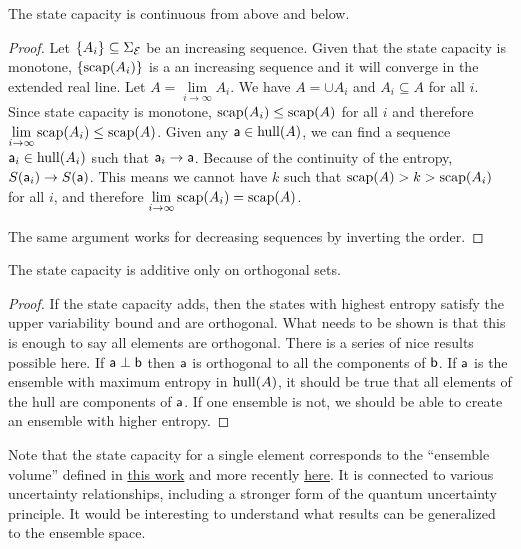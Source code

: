 \begin{mathSection}
\begin{prop}
	The state capacity is continuous from above and below.
\end{prop}

\begin{proof}
	Let $\{A_i\} \subseteq \Sigma_{\Ens}$ be an increasing sequence. Given that the state capacity is monotone, $\{\capacity(A_i)\}$ is a an increasing sequence and it will converge in the extended real line. Let $A = \lim\limits_{i \to \infty} A_i$. We have $A = \cup A_i$ and $A_i \subseteq A$ for all $i$. Since state capacity is monotone, $\capacity(A_i) \leq \capacity(A)$ for all $i$ and therefore $\lim\limits_{i \to \infty} \capacity(A_i) \leq \capacity(A)$. Given any $\ens[a] \in \hull(A)$, we can find a sequence $\ens[a]_i \in \hull(A_i)$ such that $\ens[a]_i \to \ens[a]$. Because of the continuity of the entropy, $S(\ens[a]_i) \to S(\ens[a])$. This means we cannot have $k$ such that $\capacity(A) > k > \capacity(A_i)$ for all $i$, and therefore $\lim\limits_{i \to \infty} \capacity(A_i) = \capacity(A)$.
	
	The same argument works for decreasing sequences by inverting the order.
\end{proof}

\begin{conj}
	The state capacity is additive only on orthogonal sets.
\end{conj}

\begin{proof}
	If the state capacity adds, then the states with highest entropy satisfy the upper variability bound and are orthogonal. What needs to be shown is that this is enough to say all elements are orthogonal. There is a series of nice results possible here. If $\ens[a] \ortho \ens[b]$ then $\ens[a]$ is orthogonal to all the components of $\ens[b]$. If $\ens[a]$ is the ensemble with maximum entropy in $\hull(A)$, it should be true that all elements of the hull are components of $\ens[a]$. If one ensemble is not, we should be able to create an ensemble with higher entropy.
\end{proof}
\end{mathSection}

Note that the state capacity for a single element corresponds to the ``ensemble volume'' defined in \href{https://arxiv.org/pdf/physics/9903045}{this work} and more recently \href{https://arxiv.org/pdf/1804.01343}{here}. It is connected to various uncertainty relationships, including a stronger form of the quantum uncertainty principle. It would be interesting to understand what results can be generalized to the ensemble space.


